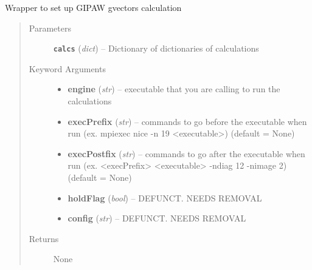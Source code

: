 \documentclass[letterpaper,10pt,english]{sphinxmanual}
\begin{document}
\begin{fulllineitems}
\label{run:run.gvectors}
Wrapper to set up GIPAW gvectors calculation
\begin{quote}\begin{description}
\item[{Parameters}] \leavevmode
\textbf{\texttt{calcs}} (\emph{dict}) -- Dictionary of dictionaries of calculations

\item[{Keyword Arguments}] \leavevmode\begin{itemize}
\item {} 
\textbf{engine} (\emph{str}) --
executable that you are calling to run the calculations

\item {} 
\textbf{execPrefix} (\emph{str}) --
commands to go before the executable when run
(ex. mpiexec nice -n 19 \textless{}executable\textgreater{}) (default = None)

\item {} 
\textbf{execPostfix} (\emph{str}) --
commands to go after the executable when run
(ex. \textless{}execPrefix\textgreater{} \textless{}executable\textgreater{} -ndiag 12 -nimage 2) (default = None)

\item {} 
\textbf{holdFlag} (\emph{bool}) --
DEFUNCT. NEEDS REMOVAL

\item {} 
\textbf{config} (\emph{str}) --
DEFUNCT. NEEDS REMOVAL

\end{itemize}

\item[{Returns}] \leavevmode
None

\end{description}\end{quote}

\end{fulllineitems}

\end{document}
